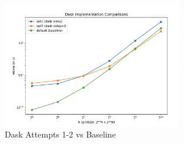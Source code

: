 \documentclass[a4paper,10pt]{article}
\begin{document}
\begin{figure}[h]
  \centering
  \includegraphics[width=0.7\textwidth]{images/dask/dask_comparison.png}
  \caption{Dask Attempts 1-2 vs Baseline}
  \label{fig:dask_attempts}
\end{figure}
\end{document}

